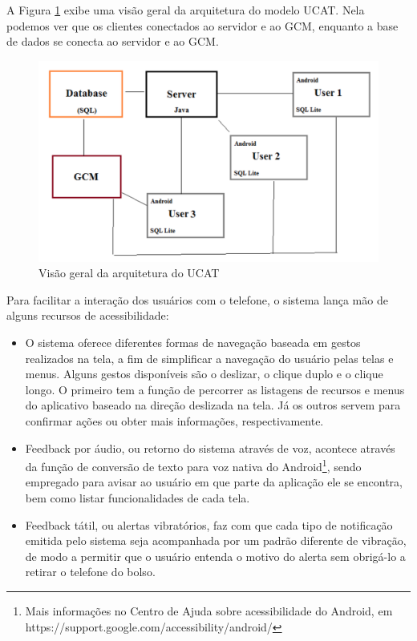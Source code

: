 \documentclass[english,brazilian]{UNISINOSmonografia}
\begin{document}
A Figura \ref{fig:visaoGeralUCAT} exibe uma visão geral da arquitetura do modelo UCAT. Nela podemos ver que os clientes conectados ao servidor e ao GCM, enquanto a base de dados se conecta ao servidor e ao GCM. 

\begin{figure}[!ht]
	\caption{Visão geral da arquitetura do UCAT}
	\label{fig:visaoGeralUCAT}
	\centering%
	\begin{minipage}{.6\textwidth}
		\includegraphics[width=\textwidth]{imgs/ucatArquitetura}
		\end{minipage}
\end{figure}

Para facilitar a interação dos usuários com o telefone, o sistema lança mão de alguns recursos de acessibilidade:
\begin{itemize}
	\item O sistema oferece diferentes formas de navegação baseada em gestos realizados na tela, a fim de simplificar a navegação do usuário pelas telas e menus. Alguns gestos disponíveis são o deslizar, o clique duplo e o clique longo. O primeiro tem a função de percorrer as listagens de recursos e menus do aplicativo baseado na direção deslizada na tela. Já os outros servem para confirmar ações ou obter mais informações, respectivamente.
	
	\item Feedback por áudio, ou retorno do sistema através de voz, acontece através da função de conversão de texto para voz nativa do Android\footnote{Mais informações no Centro de Ajuda sobre acessibilidade do Android, em https://support.google.com/accessibility/android/}, sendo empregado para avisar ao usuário em que parte da aplicação ele se encontra, bem como listar funcionalidades de cada tela.

	\item Feedback tátil, ou alertas vibratórios, faz com que cada tipo de notificação emitida pelo sistema seja acompanhada por um padrão diferente de vibração, de modo a permitir que o usuário entenda o motivo do alerta sem obrigá-lo a retirar o telefone do bolso.
\end{itemize}
\end{document}
